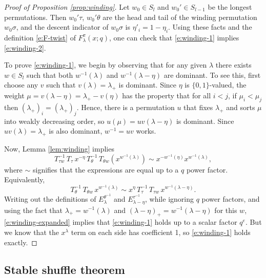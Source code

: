 \documentclass[12pt]{amsart}
\theoremstyle{definition}
\theoremstyle{remark}
\begin{document}
\begin{proof}[Proof of Proposition \ref{prop:winding}] Let $w_{0}\in
S_{l}$ and $w_{0}'\in S_{l-1}$ be the longest permutations.  Then
$w_{0}'\tau $, $w_{0}'\theta $ are the head and tail of the winding
permutation $w_{0}\sigma $, and the descent indicator of $w_{0}\sigma
$ is $\eta'_{i} = 1-\eta _{i}$.  Using these facts and the definition
\eqref{e:F-twist} of $F^{\pi }_{\lambda }(x;q)$, one can check that
\eqref{e:winding-1} implies \eqref{e:winding-2}.

To prove \eqref{e:winding-1}, we begin by observing that for any given
$\lambda $ there exists $w\in S_{l}$ such that both $w^{-1}(\lambda )$
and $w^{-1}(\lambda -\eta )$ are dominant.  To see this, first choose
any $v$ such that $v(\lambda )=\lambda _{+}$ is dominant.  Since $\eta
$ is $\{0,1 \}$-valued, the weight $\mu =v(\lambda -\eta ) = \lambda
_{+}-v(\eta )$ has the property that for all $i<j$, if $\mu _{i}<\mu
_{j}$ then $(\lambda _{+})_{i} = (\lambda _{+})_{j}$.  Hence, there is
a permutation $u$ that fixes $\lambda _{+}$ and sorts $\mu $ into
weakly decreasing order, so $u(\mu ) = uv(\lambda -\eta )$ is
dominant.  Since $uv(\lambda ) = \lambda _{+}$ is also dominant,
$w^{-1} = uv$ works.

Now, Lemma \ref{lem:winding} implies
\begin{equation}\label{e:winding-expanded-2}
T_{\tau w}^{-1}\, T_{\tau }\, x^{-\eta }\, T_{\theta }^{-1}\,
T_{\theta w} (x^{w^{-1}(\lambda) }) \sim
x^{-w^{-1}(\eta )} x^{w^{-1}(\lambda )},
\end{equation}
where $\sim$ signifies that the expressions are equal up to a $q$
power factor.  Equivalently,
\begin{equation}\label{e:winding-expanded}
T_{\theta }^{-1}\, T_{\theta w}\,
x^{w^{-1}(\lambda) } \sim x^{\eta }\, T_{\tau }^{-1}\,
T_{\tau w}\, x^{w^{-1}(\lambda - \eta )}.
\end{equation}
Writing out the definitions of $E^{\theta ^{-1}}_{\lambda }$ and
$E^{\tau ^{-1}}_{\lambda - \eta }$, while ignoring $q$ power factors,
and using the fact that $\lambda _{+} = w^{-1}(\lambda )$ and
$(\lambda -\eta )_{+} = w^{-1}(\lambda -\eta )$ for this $w$,
\eqref{e:winding-expanded} implies that \eqref{e:winding-1} holds up
to a scalar factor $q^{e}$.  But we know that the $x^{\lambda}$ term
on each side has coefficient 1, so \eqref{e:winding-1} holds exactly.
\end{proof}

\subsection{Stable shuffle theorem}
\end{document}
